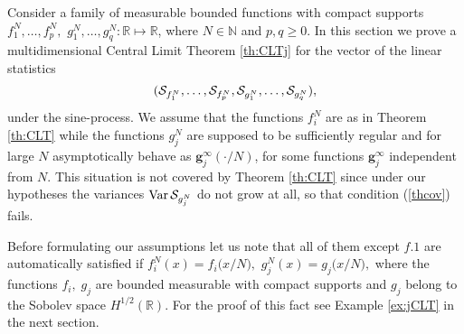 \documentclass{article}
\numberwithin{equation}{section}
\newcommand{\mR}{\mathbb{R}}
\newcommand{\mN}{\mathbb{N}}
\newcommand{\SSS}{{\cal S}}
\newcommand{\Var}{\operatorname{Var}}
\newcommand{\lbl}{\label}
\newcommand{\rtheo}{Theorem \nolinebreak}
\newcommand{\bee}{\begin{equation}}
\newcommand{\eee}{\end{equation}}
\begin{document}
Consider a family of measurable bounded functions with compact supports
$f^N_1,\ldots,f^N_p,$ $g^N_1,\ldots,g^N_q:\mR\mapsto\mR$,
where $N\in\mN$ and $p,q\geq 0$.
In this section we prove a multidimensional Central Limit Theorem  \ref{th:CLTj}
for the vector of the linear statistics
\bee\lbl{jSSS}
(\SSS_{f^N_1},\ldots,\SSS_{f^N_p}, \SSS_{g^N_1},\ldots, \SSS_{g^N_q}),
\eee
under the sine-process.
We assume that the functions $f^N_i$
are as in \rtheo \ref{th:CLT}
while the functions $g^N_j$ are supposed to be sufficiently regular
and for large $N$ asymptotically behave as $\bm g_j^\infty(\cdot/N)$,
for some functions $\bm g_j^\infty$ independent from $N$.
This situation is not covered by Theorem \ref{th:CLT}
since under our hypotheses
the variances $\Var\SSS_{g^N_j}$
do not grow at all,
so that condition (\ref{thcov}) fails.

Before formulating our assumptions
let us note that all of them except $f.1$
are automatically satisfied if
$f^N_i(x)=f_i\big(x/N\big),$
$g^N_j(x)=g_j\big(x/N\big),$
where the functions $f_i,\; g_j$ are bounded measurable with compact supports
and $g_j$ belong to the Sobolev space $H^{1/2}(\mR)$.
For the proof of this fact see Example \nolinebreak \ref{ex:jCLT} in the next section.
\end{document}
